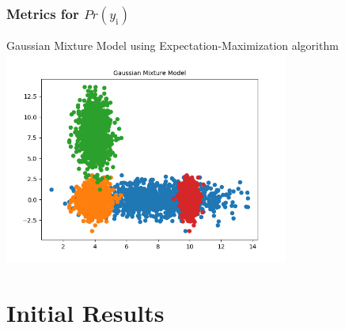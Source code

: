 \documentclass[10pt,tgadventor, onlymath]{beamer}
\begin{document}
\begin{frame}
	\frametitle{Metrics for $Pr(y_{\mathrm{i}})$}
	Gaussian Mixture Model using  Expectation-Maximization algorithm
		\includegraphics[width=\textwidth,height=7cm]{em_figure}
\end{frame}



\section{Initial Results}
\end{document}
